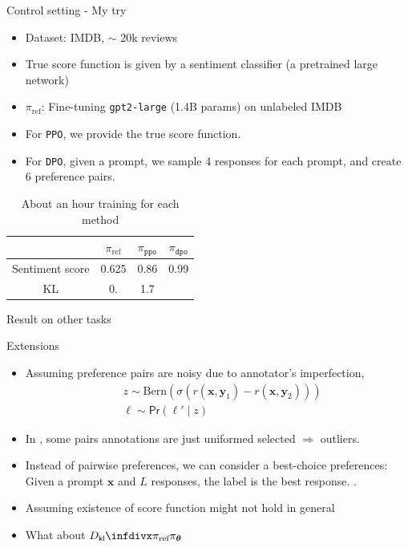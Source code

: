 \documentclass[10pt,xcolor={usenames,dvipsnames,table},aspectratio=169]{beamer}
\begin{document}
\begin{frame}{Control setting - My try }
    \begin{itemize}
        \item Dataset: IMDB, $\sim$ 20k reviews
        \item True score function is given by a sentiment classifier (a pretrained large network)
        \item $\pi_{\text{ref}}$: Fine-tuning \texttt{gpt2-large} (1.4B params) on unlabeled IMDB
        \item For \texttt{PPO}, we provide the true score function.
        \item For \texttt{DPO}, given a prompt, we sample 4 responses for each prompt, and create 6 preference pairs.
    \end{itemize}
    \begin{table}
        \centering
        \caption{About an hour training for each method}
        \begin{tabular}{|c|c|c|c|}
            \hline
            & $\pi_{\text{ref}}$  & $\pi_{\texttt{ppo}}$ & $\pi_{\texttt{dpo}}$  \\ \hline
            Sentiment score & 0.625 & 0.86 & 0.99 \\\hline
            KL & 0. & 1.7 & {\red -26.6} \\\hline
        \end{tabular}
    \end{table}
\end{frame}

\begin{frame}{Result on other tasks}
    
\end{frame}

\begin{frame}{Extensions}
    \begin{itemize}
        \item Assuming preference pairs are noisy due to annotator's imperfection, 
            \begin{align*}
            &z  \sim  \text{Bern}(\sigma(r(\bm{x}, \bm{y}_1) - r(\bm{x}, \bm{y}_2))) \\
            &\ell \sim \textsf{Pr}(\ell ' \mid z)
            \end{align*}
        \item In \citep{christiano2017deep}, some pairs annotations are just uniformed selected $\Rightarrow$ outliers.
        \item Instead of pairwise preferences, we can consider a best-choice preferences: Given a prompt $\bm{x}$ and $L$ responses, the label is the best response. \citep{ziegler2019fine}.
        \item Assuming existence of score function might not hold in general
        \item What about $\Dkl{\pi_{\text{ref}}}{\pi_{\boldsymbol \theta}}$
    \end{itemize}
\end{frame}
\end{document}
